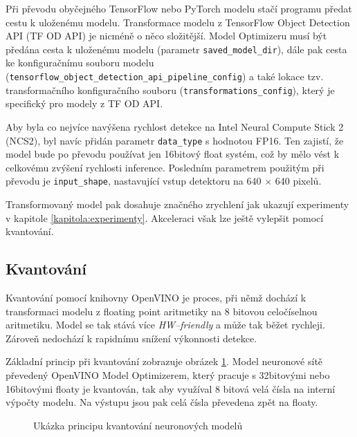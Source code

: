 Při převodu obyčejného TensorFlow nebo PyTorch modelu stačí programu předat cestu k uloženému modelu. Transformace modelu z TensorFlow Object Detection API (TF OD API) je nicméně o něco složitější. Model Optimizeru musí být předána cesta k uloženému modelu (parametr \texttt{saved\_model\_dir}), dále pak cesta ke konfiguračnímu souboru modelu (\texttt{tensorflow\_object\_detection\_api\_pipeline\_config}) a také lokace tzv. transformačního konfiguračního souboru (\texttt{transformations\_config}), který je specifický pro modely z TF OD API.

Aby byla co nejvíce navýšena rychlost detekce na Intel Neural Compute Stick 2 (NCS2), byl navíc přidán parametr \texttt{data\_type} s hodnotou FP16. Ten zajistí, že model bude po převodu používat jen 16bitový float systém, což by mělo vést k celkovému zvýšení rychlosti inference. Posledním parametrem použitým při převodu je \texttt{input\_shape}, nastavující vstup detektoru na 640 $\times$ 640 pixelů.

Transformovaný model pak dosahuje značného zrychlení jak ukazují experimenty v kapitole \ref{kapitola:experimenty}. Akceleraci však lze ještě vylepšit pomocí kvantování.

\subsection*{Kvantování}
Kvantování \cite{quantization} pomocí knihovny OpenVINO je proces, při němž dochází k transformaci modelu z floating point aritmetiky na 8 bitovou celočíselnou aritmetiku. Model se tak stává více \emph{HW--friendly} a může tak běžet rychleji. Zároveň nedochází k rapidnímu snížení výkonnosti detekce.

Základní princip při kvantování zobrazuje obrázek \ref{obrazek:kvantovani}. Model neuronové sítě převedený OpenVINO Model Optimizerem, který pracuje s 32bitovými nebo 16bitovými floaty je kvantován, tak aby využíval 8 bitová velá čísla na interní výpočty modelu. Na výstupu jsou pak celá čísla převedena zpět na floaty. 

\begin{figure}[H]
  \begin{center}
  \label{obrazek:kvantovani}
  \caption{Ukázka principu kvantování neuronových modelů \cite{quantization}}
  \end{center}
\end{figure}

